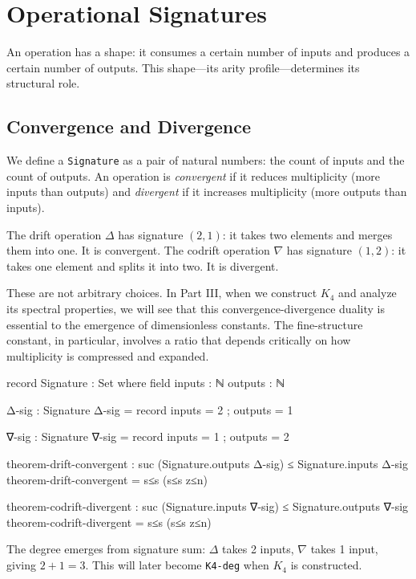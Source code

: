 \documentclass[11pt,a4paper]{book}
\begin{document}
\chapter{Operational Signatures}

An operation has a shape: it consumes a certain number of inputs and produces a 
certain number of outputs. This shape—its arity profile—determines its structural 
role.

\section{Convergence and Divergence}

We define a \texttt{Signature} as a pair of natural numbers: the count of inputs 
and the count of outputs. An operation is \emph{convergent} if it reduces multiplicity 
(more inputs than outputs) and \emph{divergent} if it increases multiplicity (more 
outputs than inputs).

The drift operation $\Delta$ has signature $(2,1)$: it takes two elements and merges 
them into one. It is convergent. The codrift operation $\nabla$ has signature $(1,2)$: 
it takes one element and splits it into two. It is divergent.

These are not arbitrary choices. In Part III, when we construct $K_4$ and analyze 
its spectral properties, we will see that this convergence-divergence duality is 
essential to the emergence of dimensionless constants. The fine-structure constant, 
in particular, involves a ratio that depends critically on how multiplicity is 
compressed and expanded.

\begin{code}
record Signature : Set where
  field
    inputs  : ℕ
    outputs : ℕ
\end{code}

\begin{code}
Δ-sig : Signature
Δ-sig = record { inputs = 2 ; outputs = 1 }

∇-sig : Signature
∇-sig = record { inputs = 1 ; outputs = 2 }

theorem-drift-convergent : suc (Signature.outputs Δ-sig) ≤ Signature.inputs Δ-sig
theorem-drift-convergent = s≤s (s≤s z≤n)

theorem-codrift-divergent : suc (Signature.inputs ∇-sig) ≤ Signature.outputs ∇-sig
theorem-codrift-divergent = s≤s (s≤s z≤n)
\end{code}

The degree emerges from signature sum: $\Delta$ takes 2 inputs, $\nabla$ takes 1 input, giving $2+1=3$.
This will later become \texttt{K4-deg} when $K_4$ is constructed.
\end{document}
